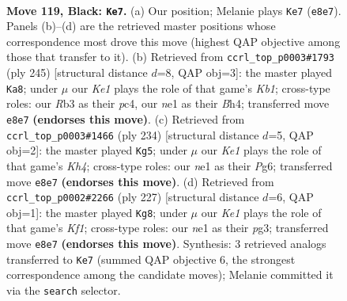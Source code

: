 \documentclass[11pt]{article}
\begin{document}
\clearpage

\begin{figure}[p]\centering
\begin{subfigure}{0.46\textwidth}\centering
\resizebox{\linewidth}{!}{%
\newchessgame
\chessboard[
  setfen={4k3/8/3R4/6K1/6P1/1r6/8/4N3 b - - 22 119},
  showmover=false,
  pgfstyle=straightmove, color=movearrow, markmove={e8-e7}
]}
\caption{}
\end{subfigure}\hfill
\begin{subfigure}{0.46\textwidth}\centering
\resizebox{\linewidth}{!}{%
\newchessgame
\chessboard[
  setfen={1k6/8/K7/P7/2P4b/7B/8/8 b - - 8 123},
  showmover=false,
  pgfstyle=straightmove, color=movearrow, markmove={b8-a8}
]}
\caption{}
\end{subfigure}
\\[4pt]
\begin{subfigure}{0.46\textwidth}\centering
\resizebox{\linewidth}{!}{%
\newchessgame
\chessboard[
  setfen={8/5R2/4p1P1/4k3/7K/8/8/2r5 w - - 0 118},
  showmover=false,
  pgfstyle=straightmove, color=movearrow, markmove={h4-g5}
]}
\caption{}
\end{subfigure}\hfill
\begin{subfigure}{0.46\textwidth}\centering
\resizebox{\linewidth}{!}{%
\newchessgame
\chessboard[
  setfen={5k2/2R5/r7/6PK/8/6P1/8/8 b - - 24 114},
  showmover=false,
  pgfstyle=straightmove, color=movearrow, markmove={f8-g8}
]}
\caption{}
\end{subfigure}
\caption{\textbf{Move 119, Black: \texttt{Ke7}.} (a) Our position; Melanie plays \texttt{Ke7} (\texttt{e8e7}). Panels (b)--(d) are the retrieved master positions whose correspondence most drove this move (highest QAP objective among those that transfer to it). (b) Retrieved from \texttt{ccrl\_top\_p0003\#1793} (ply 245) [structural distance $d$=8, QAP obj=3]: the master played \texttt{Ka8}; under $\mu$ our \emph{Ke1} plays the role of that game's \emph{Kb1}; cross-type roles: our \emph{R}b3 as their \emph{p}c4, our \emph{n}e1 as their \emph{B}h4; transferred move \texttt{e8e7} \textbf{(endorses this move)}. (c) Retrieved from \texttt{ccrl\_top\_p0003\#1466} (ply 234) [structural distance $d$=5, QAP obj=2]: the master played \texttt{Kg5}; under $\mu$ our \emph{Ke1} plays the role of that game's \emph{Kh4}; cross-type roles: our \emph{n}e1 as their \emph{P}g6; transferred move \texttt{e8e7} \textbf{(endorses this move)}. (d) Retrieved from \texttt{ccrl\_top\_p0002\#2266} (ply 227) [structural distance $d$=6, QAP obj=1]: the master played \texttt{Kg8}; under $\mu$ our \emph{Ke1} plays the role of that game's \emph{Kf1}; cross-type roles: our \emph{n}e1 as their \emph{p}g3; transferred move \texttt{e8e7} \textbf{(endorses this move)}. Synthesis: 3 retrieved analogs transferred to \texttt{Ke7} (summed QAP objective 6, the strongest correspondence among the candidate moves); Melanie committed it via the \texttt{search} selector.}
\label{fig:thought-m237}
\end{figure}
\end{document}
